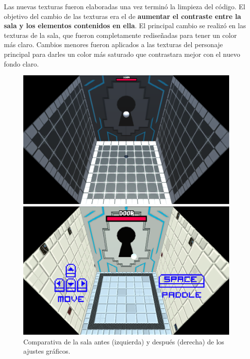 Las nuevas texturas fueron elaboradas una vez terminó la limpieza del código. El objetivo del cambio de las texturas era el de \textbf{aumentar el contraste entre la sala y los elementos contenidos en ella}. El principal cambio se realizó en las texturas de la sala, que fueron completamente rediseñadas para tener un color más claro. Cambios menores fueron aplicados a las texturas del personaje principal para darles un color más saturado que contrastara mejor con el nuevo fondo claro. 
\begin{figure}[!htb]
   \begin{minipage}{0.4\textwidth}
     \centering
     \includegraphics[width=0.9\linewidth, right]{images/resultados/desarrollo/sala_antigua}
   \end{minipage}\hfill
   \begin {minipage}{0.4\textwidth}
     \centering
     \includegraphics[width=0.9\linewidth, left]{images/resultados/desarrollo/sala_nueva}
   \end{minipage}
   \caption{Comparativa de la sala antes (izquierda) y después (derecha) de los ajustes gráficos.}
   \label{comparativa_salas}
\end{figure}


